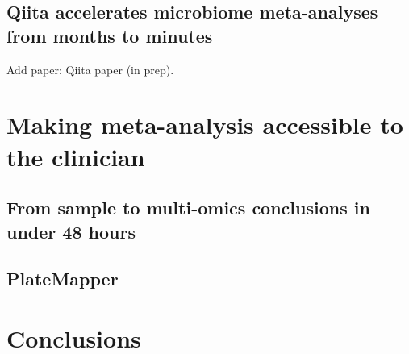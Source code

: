 \documentclass[12pt,chapterheads]{ucsd}
\begin{document}
\section{Qiita accelerates microbiome meta-analyses from months to minutes}\label{section_qiita}
Add paper: Qiita paper (in prep).

\chapter{Making meta-analysis accessible to the clinician}\label{chapter_rapid_response}
\glsresetall
\section{From sample to multi-omics conclusions in under 48 hours}\label{section_48hours}
\section{PlateMapper}\label{section_platemapper}

\chapter{Conclusions}\label{chapter_conclusions}
\glsresetall
% 

\appendix


\printindex %


\end{document}
